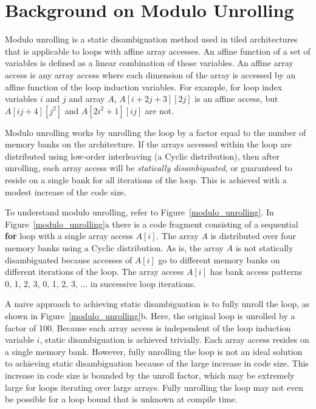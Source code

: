 \section{Background on Modulo Unrolling}\label{sec:modulo_unrolling}

Modulo unrolling \cite{barua1999maps} is a static disambiguation method used in tiled architectures that is applicable to loops with affine array accesses. An affine function of a set of variables is defined as a linear combination of those variables. An affine array access is any array access where each dimension of the array is accessed by an affine function of the loop induction variables. For example, for loop index variables $i$ and $j$ and array $A$, $A[i+2j+3][2j]$ is an affine access, but $A[ij+4][j^2]$ and $A[2i^2+1][ij]$ are not. 

Modulo unrolling works by unrolling the loop by a factor equal to the number of memory banks on the architecture. If the arrays accessed within the loop are distributed using low-order interleaving (a Cyclic distribution), then after unrolling, each array access will be \textit{statically disambiguated}, or guaranteed to reside on a single bank for all iterations of the loop. This is achieved with a modest increase of the code size. 

To understand modulo unrolling, refer to Figure~\ref{modulo_unrolling}. In Figure~\ref{modulo_unrolling}a there is a code fragment consisting of a sequential \textbf{for} loop with a single array access $A[i]$. The array $A$ is distributed over four memory banks using a Cyclic distribution. As is, the array $A$ is not statically disambiguated because accesses of $A[i]$ go to different memory banks on different iterations of the loop. The array access $A[i]$ has bank access patterns 0, 1, 2, 3, 0, 1, 2, 3, ... in successive loop iterations. 

A naive approach to achieving static disambiguation is to fully unroll the loop, as shown in Figure~\ref{modulo_unrolling}b. Here, the original loop is unrolled by a factor of 100. Because each array access is independent of the loop induction variable $i$, static disambiguation is achieved trivially. Each array access resides on a single memory bank. However, fully unrolling the loop is not an ideal solution to achieving static disambiguation because of the large increase in code size. This increase in code size is bounded by the unroll factor, which may be extremely large for loops iterating over large arrays. Fully unrolling the loop may not even be possible for a loop bound that is unknown at compile time. 


